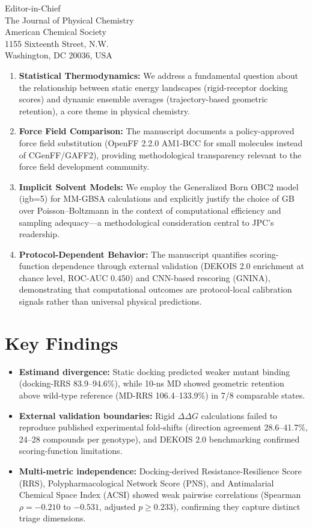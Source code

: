 \documentclass[11pt]{letter}
\begin{document}
\begin{letter}{%
    Editor-in-Chief \\
    The Journal of Physical Chemistry \\
    American Chemical Society \\
    1155 Sixteenth Street, N.W. \\
    Washington, DC 20036, USA
}
\begin{enumerate}
    \item \textbf{Statistical Thermodynamics:} We address a fundamental question about the relationship between static energy landscapes (rigid-receptor docking scores) and dynamic ensemble averages (trajectory-based geometric retention), a core theme in physical chemistry.
    
    \item \textbf{Force Field Comparison:} The manuscript documents a policy-approved force field substitution (OpenFF 2.2.0 AM1-BCC for small molecules instead of CGenFF/GAFF2), providing methodological transparency relevant to the force field development community.
    
    \item \textbf{Implicit Solvent Models:} We employ the Generalized Born OBC2 model (igb=5) for MM-GBSA calculations and explicitly justify the choice of GB over Poisson--Boltzmann in the context of computational efficiency and sampling adequacy---a methodological consideration central to JPC's readership.
    
    \item \textbf{Protocol-Dependent Behavior:} The manuscript quantifies scoring-function dependence through external validation (DEKOIS 2.0 enrichment at chance level, ROC-AUC 0.450) and CNN-based rescoring (GNINA), demonstrating that computational outcomes are protocol-local calibration signals rather than universal physical predictions.
\end{enumerate}

\section*{Key Findings}

\begin{itemize}
    \item \textbf{Estimand divergence:} Static docking predicted weaker mutant binding (docking-RRS 83.9--94.6\%), while 10-ns MD showed geometric retention above wild-type reference (MD-RRS 106.4--133.9\%) in 7/8 comparable states.
    
    \item \textbf{External validation boundaries:} Rigid $\Delta\Delta G$ calculations failed to reproduce published experimental fold-shifts (direction agreement 28.6--41.7\%, 24--28 compounds per genotype), and DEKOIS 2.0 benchmarking confirmed scoring-function limitations.
    
    \item \textbf{Multi-metric independence:} Docking-derived Resistance-Resilience Score (RRS), Polypharmacological Network Score (PNS), and Antimalarial Chemical Space Index (ACSI) showed weak pairwise correlations (Spearman $\rho = -0.210$ to $-0.531$, adjusted $p \geq 0.233$), confirming they capture distinct triage dimensions.
    

\end{itemize}
\end{letter}
\end{document}
